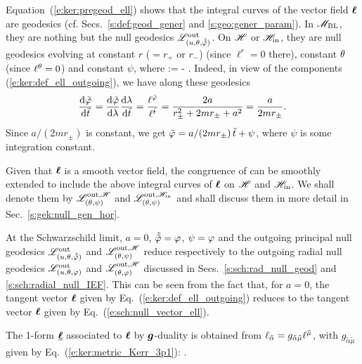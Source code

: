 \ee
Equation~(\ref{e:ker:pregeod_ell}) shows that the integral curves of the
vector field $\bm{\ell}$ are geodesics (cf. Secs.~\ref{s:def:geod_gener} and \ref{s:geo:gener_param}).
In $\mathscr{M}_{\rm BL}$, they are nothing but the null geodesics $\mathscr{L}^{\rm out}_{(u,\theta,\tilde{{\tilde\varphi}})}$.
On $\mathscr{H}$ or $\mathscr{H}_{\rm in}$, they are null geodesics evolving at constant $r$ ($=r_+$ or $r_-$)
(since $\ell^r = 0$ there),
constant $\theta$ (since $\ell^\theta = 0$) and constant $\psi$,
where
\be \label{e:ker:psi_tph_ti}
    \psi := \tph -  \ti .
\ee
Indeed, in view of the components (\ref{e:ker:def_ell_outgoing}), we have along these geodesics
\[
    \frac{\mathrm{d}{\tilde\varphi}}{\mathrm{d}{\tilde t}} = \frac{\mathrm{d}{\tilde\varphi}}{\mathrm{d}\lambda} \frac{\mathrm{d}\lambda}{\mathrm{d}{\tilde t}}
    = \frac{\ell^{\tilde\varphi}}{\ell^{\tilde t}} = \frac{2a}{r_\pm^2 + 2 m r_\pm + a^2}
   = \frac{a}{2 m r_\pm}.
\]
Since $a/(2m r_\pm)$ is constant, we get
${\tilde\varphi} = a/(2m r_\pm)\,  {\tilde t} + \psi$, where $\psi$ is some integration constant.
\begin{prop}
Given that $\bm{\ell}$ is a smooth vector field, the congruence of  can be smoothly extended to include the above integral curves of $\bm{\ell}$ on $\mathscr{H}$ and
$\mathscr{H}_{\rm in}$. We shall denote them by
$\mathscr{L}^{{\rm out},\mathscr{H}}_{(\theta,\psi)}$ and $\mathscr{L}^{{\rm out},\mathscr{H}_{\rm in}}_{(\theta,\psi)}$
and shall discuss them in more detail in Sec.~\ref{s:gek:null_gen_hor}.
\end{prop}

\begin{remark}
At the Schwarzschild limit, $a=0$, $\tilde{{\tilde\varphi}} = \varphi$, $\psi=\varphi$ and the
outgoing principal null geodesics
$\mathscr{L}^{\rm out}_{(u,\theta,\tilde{{\tilde\varphi}})}$ and
$\mathscr{L}^{{\rm out},\mathscr{H}}_{(\theta,\psi)}$ reduce respectively to the
outgoing radial null geodesics
$\mathscr{L}^{\rm out}_{(u,\theta,\varphi)}$ and
$\mathscr{L}^{{\rm out},\mathscr{H}}_{(\theta,\varphi)}$ discussed in Secs.~\ref{s:sch:rad_null_geod} and \ref{s:sch:radial_null_IEF}. This can be seen from the fact that, for $a=0$, the tangent vector
$\bm{\ell}$ given by Eq.~(\ref{e:ker:def_ell_outgoing}) reduces to the tangent
vector $\bm{\ell}$ given by Eq.~(\ref{e:sch:null_vector_ell}).
\end{remark}



The 1-form $\underline{\bm{\ell}}$ associated to $\bm{\ell}$ by
$\bm{g}$-duality is obtained
from $\ell_{\tilde{\alpha}} = g_{\tilde{\alpha}\tilde{\mu}} \ell^{\tilde{\mu}}$, with
$g_{\tilde{\alpha}\tilde{\mu}}$ given by Eq.~(\ref{e:ker:metric_Kerr_3p1}):
\be \label{e:ker:ell_form_Kerr}
     .
\ee

